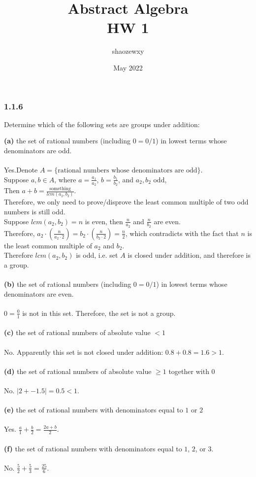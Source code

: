 \documentclass{article}
\title{Abstract Algebra\\
\large{HW 1}}
\author{shaozewxy }
\date{May 2022}
\begin{document}
\maketitle

\setcounter{secnumdepth}{0}
\subsubsection{1.1.6}
Determine which of the following sets are groups under addition:\\
\begin{addmargin}[1em]{0em}
\textbf{(a)} the set of rational numbers (including $0=0/1$) in lowest terms whose denominators are odd.\\\\
Yes.Denote $A=\{\textrm{rational numbers whose denominators are odd}\}$.\\
Suppose $a, b\in A$, where $a = \frac{a_1}{a_2}$, $b=\frac{b_1}{b_2}$, and $a_2, b_2$ odd,\\
Then $a+b=\frac{\textrm{something}}{lcm(a_2, b_2)}$.\\
Therefore, we only need to prove/disprove the least common multiple of two odd numbers is still odd.\\
Suppose $lcm(a_2, b_2) = n$ is even, then $\frac{n}{a_2}$ and $\frac{n}{b_2}$ are even.\\
Therefore, $a_2 \cdot (\frac{n}{a_2 \cdot 2}) = b_2 \cdot (\frac{n}{b_2 \cdot 2}) = \frac{n}{2}$, which contradicts with the fact that $n$ is the least common multiple of $a_2$ and $b_2$.\\
Therefore $lcm(a_2, b_2)$ is odd, i.e. set $A$ is closed under addition, and therefore is a group.\\\\
\textbf{(b)} the set of rational numbers (including $0=0/1$) in lowest terms whose denominators are even.\\\\
$0=\frac{0}{1}$ is not in this set. Therefore, the set is not a group.\\\\
\textbf{(c)} the set of rational numbers of absolute value $<1$\\\\
No. Apparently this set is not closed under addition: $0.8 + 0.8 = 1.6 > 1$.\\\\
\textbf{(d)} the set of rational numbers of absolute value $\geq 1$ together with $0$\\\\
No. $|2 + -1.5| = 0.5 < 1$.\\\\
\textbf{(e)} the set of rational numbers with denominators equal to $1$ or $2$\\\\
Yes. $\frac{a}{1} + \frac{b}{2} = \frac{2 a + b}{2}$.\\\\
\textbf{(f)} the set of rational numbers with denominators equal to $1$, $2$, or $3$.\\\\
No. $\frac{5}{2} + \frac{5}{3} = \frac{25}{6}$.
\end{addmargin}
\end{document}
